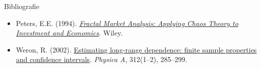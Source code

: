 \begin{frame}{Bibliografie}
\begin{itemize}
    \item Peters, E.E. (1994). \href{https://www.wiley.com/en-us/Fractal+Market+Analysis\%3A+Applying+Chaos+Theory+to+Investment+and+Economics-p-9780471585244}{\textit{Fractal Market Analysis: Applying Chaos Theory to Investment and Economics}}. Wiley.
    \item Weron, R. (2002). \href{https://doi.org/10.1016/S0378-4371(02)00961-5}{Estimating long-range dependence: finite sample properties and confidence intervals}. \textit{Physica A}, 312(1--2), 285--299.
\end{itemize}
\end{frame}


